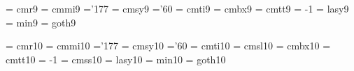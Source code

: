  \font\ninrm  = cmr9               %
 \font\ninmi  = cmmi9              %
    \skewchar\ninmi ='177          %
 \font\ninsy  = cmsy9              %
    \skewchar\ninsy ='60           %
 \font\ninit  = cmti9              %
 \font\ninbf  = cmbx9              %
 \font\nintt  = cmtt9              %
    \hyphenchar\nintt = -1         %
 \font\ninly  = lasy9             %
\font\ninmin = min9		   %
\font\ningt = goth9		   %

 \font\tenrm  = cmr10    %
 \font\tenmi  = cmmi10   %
    \skewchar\tenmi ='177  %
 \font\tensy  = cmsy10   %
    \skewchar\tensy ='60 %
 \font\tenit  = cmti10   %
 \font\tensl  = cmsl10   %
 \font\tenbf  = cmbx10   %
 \font\tentt  = cmtt10   %
    \hyphenchar\tentt = -1         %
 \font\tensf  = cmss10   %
 \font\tenly  = lasy10   %
\font\tenmin = min10     %
\font\tengt = goth10	 %

